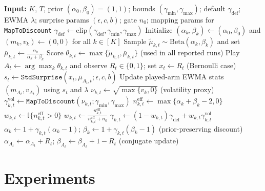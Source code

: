 \documentclass{article}
\begin{document}
\begin{algorithm}[t]
\caption{\textsc{VG-dTS}: Variance-Gated Discounted Thompson Sampling (reported optimistic configuration)}
\label{alg:vgdts}
\begin{algorithmic}[1]
\STATE \textbf{Input:} $K$, $T$, prior $(\alpha_0,\beta_0)=(1,1)$; bounds $(\gamma_{\min},\gamma_{\max})$; default $\gamma_{\mathrm{def}}$;
EWMA $\lambda$; surprise params $(\epsilon,c,b)$; gate $n_0$; mapping params for \texttt{MapToDiscount}
\STATE $\gamma_{\mathrm{def}}\leftarrow\mathrm{clip}(\gamma_{\mathrm{def}},\gamma_{\min},\gamma_{\max})$
\STATE Initialize $(\alpha_k,\beta_k)\leftarrow(\alpha_0,\beta_0)$ and $(m_k,v_k)\leftarrow(0,0)$ for all $k\in[K]$
        \STATE Sample $\widetilde{\mu}_{k,t}\sim \mathrm{Beta}(\alpha_k,\beta_k)$ and set $\bar{\mu}_{k,t}\leftarrow \frac{\alpha_k}{\alpha_k+\beta_k}$
        \STATE Score $\theta_{k,t}\leftarrow \max\{\widetilde{\mu}_{k,t},\bar{\mu}_{k,t}\}$ \hfill (used in all reported runs)
    \ENDFOR
    \STATE Play $A_t\leftarrow\arg\max_k \theta_{k,t}$ and observe $R_t\in\{0,1\}$; set $x_t\leftarrow R_t$ \hfill (Bernoulli case)
    \STATE $s_t\leftarrow \texttt{StdSurprise}(x_t,\bar{\mu}_{A_t,t};\epsilon,c,b)$
    \STATE Update played-arm EWMA stats $(m_{A_t},v_{A_t})$ using $s_t$ and $\lambda$
        \STATE $\nu_{k,t}\leftarrow\sqrt{\max\{v_k,0\}}$ \hfill (volatility proxy)
        \STATE $\gamma^{\mathrm{vol}}_{k,t}\leftarrow \texttt{MapToDiscount}(\nu_{k,t};\gamma_{\min},\gamma_{\max})$
        \STATE $n^{\mathrm{eff}}_{k,t}\leftarrow \max\{\alpha_k+\beta_k-2,0\}$
            \STATE $w_{k,t}\leftarrow \mathbb{I}\{n^{\mathrm{eff}}_{k,t}>0\}$
        \ELSE
            \STATE $w_{k,t}\leftarrow \frac{n^{\mathrm{eff}}_{k,t}}{n^{\mathrm{eff}}_{k,t}+n_0}$
        \ENDIF
        \STATE $\gamma_{k,t}\leftarrow (1-w_{k,t})\gamma_{\mathrm{def}} + w_{k,t}\gamma^{\mathrm{vol}}_{k,t}$
        \STATE $\alpha_k\leftarrow 1+\gamma_{k,t}(\alpha_k-1)$;\quad
        $\beta_k\leftarrow 1+\gamma_{k,t}(\beta_k-1)$ \hfill (prior-preserving discount)
    \ENDFOR
    \STATE $\alpha_{A_t}\leftarrow \alpha_{A_t}+R_t$;\quad
    $\beta_{A_t}\leftarrow \beta_{A_t}+1-R_t$ \hfill (conjugate update)
\ENDFOR
\end{algorithmic}
\end{algorithm}

\section{Experiments}
\end{document}
